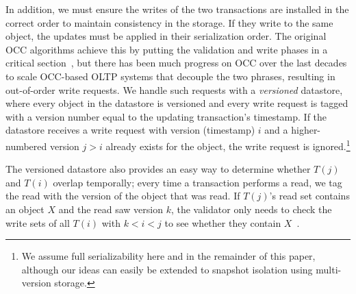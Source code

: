 In addition, we must ensure the writes of the two transactions are installed in the correct order to maintain consistency in the storage. If they write to the same object, the updates must be applied in their serialization order. The original OCC algorithms achieve this by putting the validation and write phases in a critical section~\cite{kung81tods}, but there has been much progress on OCC over the last decades to scale OCC-based OLTP systems that decouple the two phrases, resulting in out-of-order write requests. We handle such requests with a \emph{versioned} datastore, where every object in the datastore is versioned and every write request is tagged with a version number equal to the updating transaction's timestamp. If the datastore receives a write request with version (timestamp) $i$ and a higher-numbered version $j > i$ already exists for the object, the write request is ignored.\footnote{We assume full serializability here and in the remainder of this paper, although our ideas can easily be extended to snapshot isolation using multi-version storage.}


The versioned datastore also provides an easy way to determine whether $T(j)$ and $T(i)$ overlap temporally; every time a transaction performs a read, we tag the read with the version of the object that was read. If $T(j)$'s read set contains an object $X$ and the read saw version $k$, the validator only needs to check the write sets of all $T(i)$ with $k < i < j$ to see whether they contain $X$~\cite{ding2015centiman}.

